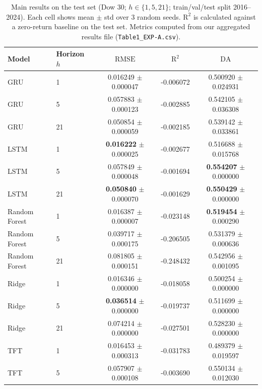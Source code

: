 \documentclass[10pt,twocolumn]{article}
\newcommand{\rmse}{\ensuremath{\mathrm{RMSE}}}
\newcommand{\rTwo}{\ensuremath{\mathrm{R}^2}}
\newcommand{\da}{\ensuremath{\mathrm{DA}}}
\begin{document}

\begin{table}[t]
    \centering
    \caption{Main results on the test set (Dow 30; $h\in\{1,5,21\}$; train/val/test split 2016--2024). Each cell shows mean $\pm$ std over 3 random seeds. \rTwo{} is calculated against a zero-return baseline on the test set. Metrics computed from our aggregated results file (\texttt{Table1\_EXP-A.csv}).}
    \label{tab:main}
    \begin{tabular}{llccc}
        \toprule
        Model & Horizon $h$ & $\rmse$ & $\rTwo$ & $\da$ \\
        \midrule
        GRU            & 1  & 0.016249 $\pm$ 0.000047 & -0.006072 & 0.500920 $\pm$ 0.024931 \\
        GRU            & 5  & 0.057883 $\pm$ 0.000123 & -0.002885 & 0.542105 $\pm$ 0.036308 \\
        GRU            & 21 & 0.050854 $\pm$ 0.000059 & -0.002185 & 0.539142 $\pm$ 0.033861 \\
        LSTM           & 1  & \textbf{0.016222} $\pm$ 0.000025 & -0.002677 & 0.516688 $\pm$ 0.015768 \\
        LSTM           & 5  & 0.057849 $\pm$ 0.000048 & -0.001694 & \textbf{0.554207} $\pm$ 0.000000 \\
        LSTM           & 21 & \textbf{0.050840} $\pm$ 0.000070 & -0.001629 & \textbf{0.550429} $\pm$ 0.000000 \\
        Random Forest  & 1  & 0.016387 $\pm$ 0.000007 & -0.023148 & \textbf{0.519454} $\pm$ 0.000290 \\
        Random Forest  & 5  & 0.039717 $\pm$ 0.000175 & -0.206505 & 0.531379 $\pm$ 0.000636 \\
        Random Forest  & 21 & 0.081805 $\pm$ 0.000151 & -0.248432 & 0.542956 $\pm$ 0.001095 \\
        Ridge          & 1  & 0.016346 $\pm$ 0.000000 & -0.018058 & 0.500254 $\pm$ 0.000000 \\
        Ridge          & 5  & \textbf{0.036514} $\pm$ 0.000000 & -0.019737 & 0.511699 $\pm$ 0.000000 \\
        Ridge          & 21 & 0.074214 $\pm$ 0.000000 & -0.027501 & 0.528230 $\pm$ 0.000000 \\
        TFT            & 1  & 0.016453 $\pm$ 0.000313 & -0.031783 & 0.489379 $\pm$ 0.019597 \\
        TFT            & 5  & 0.057907 $\pm$ 0.000108 & -0.003690 & 0.550134 $\pm$ 0.012030 \\

\end{tabular}
\end{table}
\end{document}
